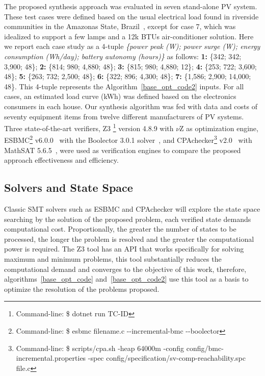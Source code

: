 \documentclass[10pt,journal,compsoc]{IEEEtran}
\begin{document}
The proposed synthesis approach was evaluated in seven stand-alone PV system. These test cases were defined based on the usual electrical load found in riverside communities in the Amazonas State, Brazil~\cite{TrindadeCordeiro19,Agrener2013}, except for case 7, which was idealized to support a few lamps and a 12k BTUs air-conditioner solution. 
Here we report each case study as a 4-tuple \textit{\{power peak (W); power surge (W); energy consumption (Wh/day); battery autonomy (hours)\}} as follows:
  \textbf{1:} \{342; 342; 3,900; 48\}; \textbf{2:} \{814; 980; 4,880; 48\}; \textbf{3:} \{815; 980; 4,880; 12\}; \textbf{4:} \{253; 722; 3,600; 48\}; \textbf{5:} \{263; 732; 2,500; 48\}; \textbf{6:} \{322; 896; 4,300; 48\}; \textbf{7:} \{1,586; 2,900; 14,000; 48\}. This 4-tuple represents the Algorithm~\ref{base_opt_code2} inputs. For all cases, an estimated load curve (kWh) was defined based on the electronics consumers in each house. Our synthesis algorithm was fed with data and costs of seventy equipment items from twelve different manufacturers of PV systems. 
%
Three state-of-the-art verifiers, Z3 \footnote{Command-line: \$ dotnet run TC-ID} version 4.8.9 with $\nu$Z as optimization engine, ESBMC\footnote{Command-line: \$ esbmc filename.c -\phantom{}-incremental-bmc -\phantom{}-boolector} v6.0.0~\cite{esbmc2018} with the Boolector 3.0.1 solver~\cite{Brummayer}, and CPAchecker\footnote{Command-line: \$ scripts/cpa.sh -heap 64000m -config config/bmc-incremental.properties -spec config/specification/sv-comp-reachability.spc file.c} v2.0~\cite{Beyer2011} with MathSAT 5.6.5~\cite{mathsat5}, were used as verification engines to compare the proposed approach effectiveness and efficiency.  \color{black}

\subsection{Solvers and State Space}
\label{sec:SolversandStateSpace}
  Classic SMT solvers such as ESBMC and CPAchecker will explore the state space searching by the solution of the proposed problem, each verified state demands computational cost. Proportionally, the greater the number of states to be processed, the longer the problem is resolved and the greater the computational power is required. The Z3 tool has an API that works specifically for solving maximum and minimum problems, this tool substantially reduces the computational demand and converges to the objective of this work, therefore, algorithms~\ref{base_opt_code} and~\ref{base_opt_code2} use this tool as a basis to optimize the resolution of the problems proposed.
\end{document}

